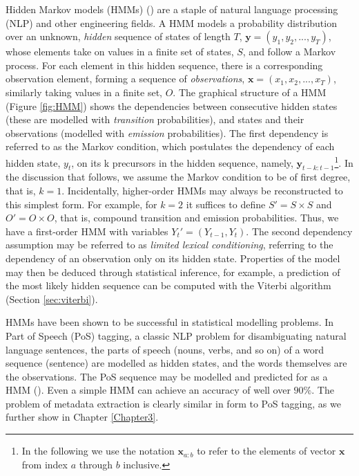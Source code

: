 Hidden Markov models (HMMs) (\cite{rabiner1989tutorial}) are a staple of natural language processing (NLP) and other engineering fields. A HMM models a probability distribution over an unknown, \emph{hidden} sequence of states of length $T$, $\mathbf{y} = (y_1, y_2, ..., y_T)$, whose elements take on values in a finite set of states, $S$, and follow a Markov process. For each element in this hidden sequence, there is a corresponding observation element, forming a sequence of \emph{observations}, $\mathbf{x} = (x_1, x_2, ..., x_T)$, similarly taking values in a finite set, $O$. The graphical structure of a HMM (Figure \ref{fig:HMM}) shows the dependencies between consecutive hidden states (these are modelled with \emph{transition} probabilities), and states and their observations (modelled with \emph{emission} probabilities). The first dependency is referred to as the Markov condition, which postulates the dependency of each hidden state, $y_t$, on its k precursors in the hidden sequence, namely, $\mathbf{y}_{t-k:t-1}$\footnote{In the following we use the notation $\mathbf{x}_{a:b}$ to refer to the elements of vector $\mathbf{x}$ from index $a$ through $b$ inclusive.}. In the discussion that follows, we assume the Markov condition to be of first degree, that is, $k =1$. Incidentally, higher-order HMMs may always be reconstructed to this simplest form. For example, for $k = 2$ it suffices to define $S' = S \times S$ and $O' = O \times O$, that is, compound transition and emission probabilities. Thus, we have a first-order HMM with variables $Y_t' = (Y_{t-1}, Y_t)$. The second dependency assumption may be referred to as \emph{limited lexical conditioning}, referring to the dependency of an observation only on its hidden state. Properties of the model may then be deduced through statistical inference, for example, a prediction of the most likely hidden sequence can be computed with the Viterbi algorithm (Section \ref{sec:viterbi}).

HMMs have been shown to be successful in statistical modelling problems. In Part of Speech (PoS) tagging, a classic NLP problem for disambiguating natural language sentences, the parts of speech (nouns, verbs, and so on) of a word sequence (sentence) are modelled as hidden states, and the words themselves are the observations. The PoS sequence may be modelled and predicted for as a HMM (\cite{charniak1993equations}). Even a simple HMM can achieve an accuracy of well over $90\%$. The problem of metadata extraction is clearly similar in form to PoS tagging, as we further show in Chapter \ref{Chapter3}.

